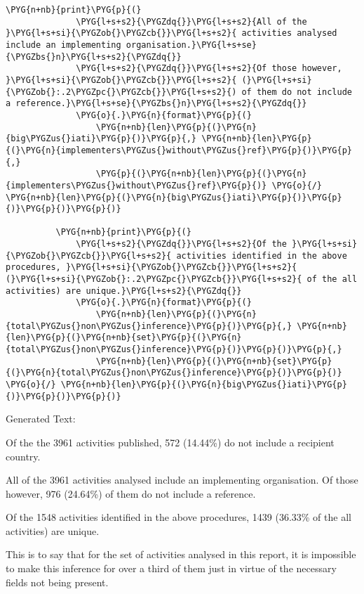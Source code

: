 \documentclass[letterpaper,10pt,english]{sphinxmanual}
\begin{document}
\begin{Verbatim}[commandchars=\\\{\}]
          \PYG{n+nb}{print}\PYG{p}{(}
              \PYG{l+s+s2}{\PYGZdq{}}\PYG{l+s+s2}{All of the }\PYG{l+s+si}{\PYGZob{}\PYGZcb{}}\PYG{l+s+s2}{ activities analysed include an implementing organisation.}\PYG{l+s+se}{\PYGZbs{}n}\PYG{l+s+s2}{\PYGZdq{}}
              \PYG{l+s+s2}{\PYGZdq{}}\PYG{l+s+s2}{Of those however, }\PYG{l+s+si}{\PYGZob{}\PYGZcb{}}\PYG{l+s+s2}{ (}\PYG{l+s+si}{\PYGZob{}:.2\PYGZpc{}\PYGZcb{}}\PYG{l+s+s2}{) of them do not include a reference.}\PYG{l+s+se}{\PYGZbs{}n}\PYG{l+s+s2}{\PYGZdq{}}
              \PYG{o}{.}\PYG{n}{format}\PYG{p}{(}
                  \PYG{n+nb}{len}\PYG{p}{(}\PYG{n}{big\PYGZus{}iati}\PYG{p}{)}\PYG{p}{,} \PYG{n+nb}{len}\PYG{p}{(}\PYG{n}{implementers\PYGZus{}without\PYGZus{}ref}\PYG{p}{)}\PYG{p}{,}
                  \PYG{p}{(}\PYG{n+nb}{len}\PYG{p}{(}\PYG{n}{implementers\PYGZus{}without\PYGZus{}ref}\PYG{p}{)} \PYG{o}{/} \PYG{n+nb}{len}\PYG{p}{(}\PYG{n}{big\PYGZus{}iati}\PYG{p}{)}\PYG{p}{)}\PYG{p}{)}\PYG{p}{)}
          
          \PYG{n+nb}{print}\PYG{p}{(}
              \PYG{l+s+s2}{\PYGZdq{}}\PYG{l+s+s2}{Of the }\PYG{l+s+si}{\PYGZob{}\PYGZcb{}}\PYG{l+s+s2}{ activities identified in the above procedures, }\PYG{l+s+si}{\PYGZob{}\PYGZcb{}}\PYG{l+s+s2}{ (}\PYG{l+s+si}{\PYGZob{}:.2\PYGZpc{}\PYGZcb{}}\PYG{l+s+s2}{ of the all activities) are unique.}\PYG{l+s+s2}{\PYGZdq{}}
              \PYG{o}{.}\PYG{n}{format}\PYG{p}{(}
                  \PYG{n+nb}{len}\PYG{p}{(}\PYG{n}{total\PYGZus{}non\PYGZus{}inference}\PYG{p}{)}\PYG{p}{,} \PYG{n+nb}{len}\PYG{p}{(}\PYG{n+nb}{set}\PYG{p}{(}\PYG{n}{total\PYGZus{}non\PYGZus{}inference}\PYG{p}{)}\PYG{p}{)}\PYG{p}{,}
                  \PYG{n+nb}{len}\PYG{p}{(}\PYG{n+nb}{set}\PYG{p}{(}\PYG{n}{total\PYGZus{}non\PYGZus{}inference}\PYG{p}{)}\PYG{p}{)} \PYG{o}{/} \PYG{n+nb}{len}\PYG{p}{(}\PYG{n}{big\PYGZus{}iati}\PYG{p}{)}\PYG{p}{)}\PYG{p}{)}
\end{Verbatim}
%
\begin{OriginalVerbatim}[commandchars=\\\{\}]
Generated Text:

Of the the 3961 activities published, 572 (14.44\%) do not include a recipient country.

All of the 3961 activities analysed include an implementing organisation.
Of those however, 976 (24.64\%) of them do not include a reference.

Of the 1548 activities identified in the above procedures, 1439 (36.33\% of the all activities) are unique.
\end{OriginalVerbatim}
\relax
This is to say that for the set of activities analysed in this report,
it is impossible to make this inference for over a third of them just in
virtue of the necessary fields not being present.
\end{document}
